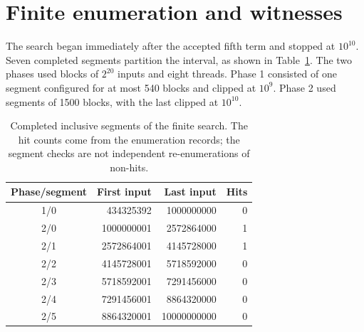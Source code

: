 \documentclass[11pt,a4paper]{article}
\theoremstyle{remark}
\begin{document}
\section{Finite enumeration and witnesses}
The search began immediately after the accepted fifth term and stopped at
$10^{10}$. Seven completed segments partition the interval, as shown in
Table~\ref{tab:coverage}. The two phases used blocks of $2^{20}$ inputs
and eight threads. Phase 1 consisted of one segment configured for at most
540 blocks and clipped at $10^9$. Phase 2 used segments of 1500 blocks,
with the last clipped at $10^{10}$.
\begin{table}[htbp]
\centering
\begin{tabular}{crrr}
\toprule
Phase/segment & First input & Last input & Hits\\
\midrule
1/0 & 434325392 & 1000000000 & 0\\
2/0 & 1000000001 & 2572864000 & 1\\
2/1 & 2572864001 & 4145728000 & 1\\
2/2 & 4145728001 & 5718592000 & 0\\
2/3 & 5718592001 & 7291456000 & 0\\
2/4 & 7291456001 & 8864320000 & 0\\
2/5 & 8864320001 & 10000000000 & 0\\
\bottomrule
\end{tabular}
\caption{Completed inclusive segments of the finite search. The hit counts
come from the enumeration records; the segment checks are not independent
re-enumerations of non-hits.}\label{tab:coverage}
\end{table}
\end{document}

